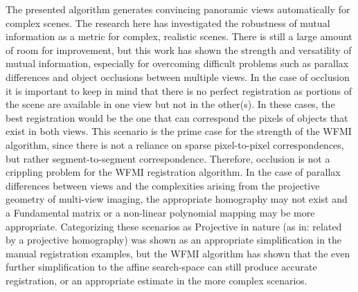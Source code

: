 %
%
%
%
%
%

%
%
%



The presented algorithm generates convincing panoramic views automatically for complex scenes. The research here has investigated the robustness of mutual information as a metric for complex, realistic scenes. There is still a large amount of room for improvement, but this work has shown the strength and versatility of mutual information, especially for overcoming difficult problems such as parallax differences and object occlusions between multiple views. In the case of occlusion it is important to keep in mind that there is no perfect registration as portions of the scene are available in one view but not in the other(s). In these cases, the best registration would be the one that can correspond the pixels of objects that exist in both views. This scenario is the prime case for the strength of the WFMI algorithm, since there is not a reliance on sparse pixel-to-pixel correspondences, but rather segment-to-segment correspondence. Therefore, occlusion is not a crippling problem for the WFMI registration algorithm. In the case of parallax differences between views and the complexities arising from the projective geometry of multi-view imaging, the appropriate homography may not exist and a Fundamental matrix or a non-linear polynomial mapping may be more appropriate. Categorizing these scenarios as Projective in nature (as in: related by a projective homography) was shown as an appropriate simplification in the manual registration examples, but the WFMI algorithm has shown that the even further simplification to the affine search-space can still produce accurate registration, or an appropriate estimate in the more complex scenarios.

